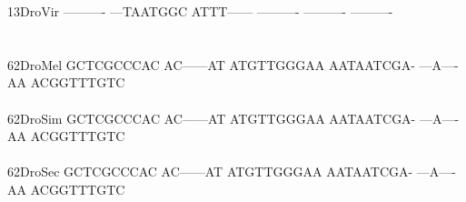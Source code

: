 \documentclass[11pt,twoside,reqno,a4paper]{article}
\begin{document}
{13\hspace*{2\charwidth}DroVir	----------	---TAATGGC	ATTT------	----------	----------	----------	\\
\hspace*{4\charwidth}\hspace*{7\charwidth}\hspace*{1\charwidth}\hspace*{1\charwidth}\hspace*{1\charwidth}\hspace*{1\charwidth}\hspace*{1\charwidth}\hspace*{1\charwidth}\\
\\
62\hspace*{2\charwidth}DroMel	GCTCGCCCAC	AC------AT	ATGTTGGGAA	AATAATCGA-	---A----AA	ACGGTTTGTC	\\
\hspace*{4\charwidth}\hspace*{7\charwidth}\hspace*{1\charwidth}\hspace*{1\charwidth}\hspace*{1\charwidth}\hspace*{1\charwidth}\hspace*{1\charwidth}\hspace*{1\charwidth}\\
62\hspace*{2\charwidth}DroSim	GCTCGCCCAC	AC------AT	ATGTTGGGAA	AATAATCGA-	---A----AA	ACGGTTTGTC	\\
\hspace*{4\charwidth}\hspace*{7\charwidth}\hspace*{1\charwidth}\hspace*{1\charwidth}\hspace*{1\charwidth}\hspace*{1\charwidth}\hspace*{1\charwidth}\hspace*{1\charwidth}\\
62\hspace*{2\charwidth}DroSec	GCTCGCCCAC	AC------AT	ATGTTGGGAA	AATAATCGA-	---A----AA	ACGGTTTGTC	\\
\hspace*{4\charwidth}\hspace*{7\charwidth}\hspace*{1\charwidth}\hspace*{1\charwidth}\hspace*{1\charwidth}\hspace*{1\charwidth}\hspace*{1\charwidth}\hspace*{1\charwidth}\\
}
\end{document}
